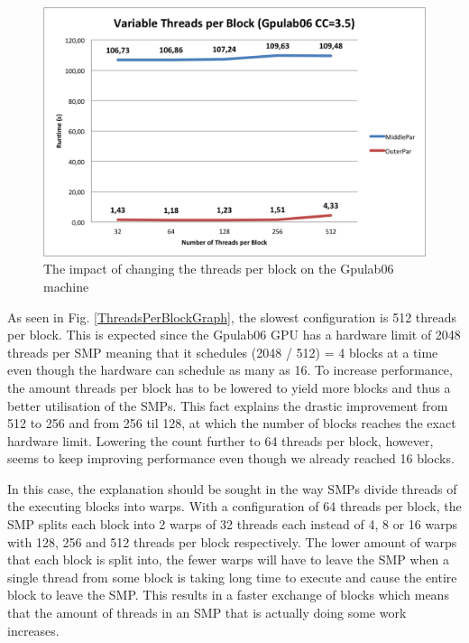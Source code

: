 \begin{figure}
\begin{center}
	\includegraphics[width=\textwidth]{img/Gpulab-tpb35.png}
\end{center}
\caption{The impact of changing the threads per block on the Gpulab06 machine}
\end{figure}

\noindent As seen in Fig. \ref{ThreadsPerBlockGraph}, the slowest configuration is 512 threads per block. This is expected since the Gpulab06 GPU has a hardware limit of 2048 threads per SMP meaning that it schedules (2048 / 512) = 4 blocks at a time even though the hardware can schedule as many as 16. To increase performance, the amount threads per block has to be lowered to yield more blocks and thus a better utilisation of the SMPs. This fact explains the drastic improvement from 512 to 256 and from 256 til 128, at which the number of blocks reaches the exact hardware limit. Lowering the count further to 64 threads per block, however, seems to keep improving performance even though we already reached 16 blocks. 

In this case, the explanation should be sought in the way SMPs divide threads of the executing blocks into warps. With a configuration of 64 threads per block, the SMP splits each block into 2 warps of 32 threads each instead of 4, 8 or 16 warps with 128, 256 and 512 threads per block respectively. The lower amount of warps that each block is split into, the fewer warps will have to leave the SMP when a single thread from some block is taking long time to execute and cause the entire block to leave the SMP. This results in a faster exchange of blocks which means that the amount of threads in an SMP that is actually doing some work increases.\\

